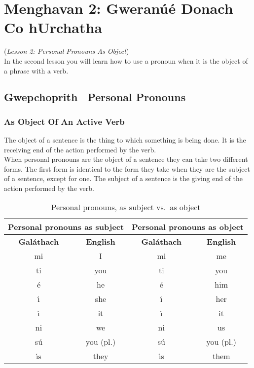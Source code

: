 \section{Menghavan 2: Gweran\'{u}\'{e} Donach Co hUrchatha}
(\textit{Lesson 2: Personal Pronouns As Object})\\

In the second lesson you will learn how to use a pronoun when it is the object of a phrase with a verb.

\subsection{Gwepchoprith \textendash\ Personal Pronouns}
\subsubsection{As Object Of An Active Verb}

The object of a sentence is the thing to which something is being done. It is the receiving end of the action performed by the verb.\\

When personal pronouns are the object of a sentence they can take two different forms. The first form is identical to the form they take when they are the subject of a sentence, except for one. The subject of a sentence is the giving end of the action performed by the verb.

\begin{table}[H]
\centering
\begin{tabular}{cccc}
  \toprule
  \multicolumn{2}{c}{\textbf{Personal pronouns as subject}} & \multicolumn{2}{c}{\textbf{Personal pronouns as object}}\\
  \midrule
  \textbf{Gal\'{a}thach} & \textbf{English} & \textbf{Gal\'{a}thach} & \textbf{English}\\
  \cmidrule(lr){1-1}\cmidrule(lr){2-2}\cmidrule(lr){3-3}\cmidrule(lr){4-4}
  mi & I & mi & me\\
  ti & you & ti & you\\
  \'{e} & he & \'{e} & him\\
  \'{\i} & she & \'{\i} & her\\
  \'{\i} & it & \'{\i} & it\\
  ni & we & ni & us\\
  s\'{u} & you (pl.) & s\'{u} & you (pl.)\\
  \'{\i}s & they & \'{\i}s & them\\
  \bottomrule
\end{tabular}
\caption{Personal pronouns, as subject vs.\ as object}
\label{personal_pronouns_subject_object}
\end{table}

